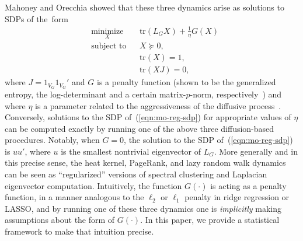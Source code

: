 \documentclass[12pt]{article}
\theoremstyle{plain}
\begin{document}
Mahoney and Orecchia showed that these three dynamics arise as solutions to 
SDPs of the~form
\begin{equation}
\begin{aligned}
  & \underset{X}{\text{minimize}}
  & & \mathrm{tr}(L_G X) + \tfrac{1}{\eta} G(X) \\
  & \text{subject to}
  & & X \succeq 0, \\
  & & & \mathrm{tr}(X) = 1, \\
  & & & \mathrm{tr}(X J) = 0,
\end{aligned}
\label{eqn:mo-reg-sdp}
\end{equation}
where $J = 1_{V_G} 1_{V_G}'$ and $G$ is a penalty function (shown to be the 
generalized entropy, the log-determinant and a certain matrix-$p$-norm, 
respectively~\cite{mahoney2010implementing}) and where $\eta$ is a 
parameter related to the aggressiveness of the diffusive 
process~\cite{mahoney2010implementing}.  
Conversely, solutions to the SDP of~(\ref{eqn:mo-reg-sdp}) for appropriate 
values of $\eta$ can be computed exactly by running one of the above 
three diffusion-based procedures.
Notably, when $G = 0$, the solution to the SDP 
of~(\ref{eqn:mo-reg-sdp}) is $u u'$, where $u$ is the smallest nontrivial 
eigenvector of $L_G$.  
More generally and in this precise sense, the heat kernel, PageRank, and lazy 
random walk dynamics can be seen as ``regularized'' versions of spectral 
clustering and Laplacian eigenvector computation.
Intuitively, the function $G(\cdot)$ is acting as a penalty function, in a 
manner analogous to the $\ell_2$ or $\ell_1$ penalty in ridge regression or 
LASSO, and by running one of these three dynamics one is \emph{implicitly} 
making assumptions about the form of $G(\cdot)$.
In this paper, we provide a statistical framework to make that intuition 
precise.

\end{document}
